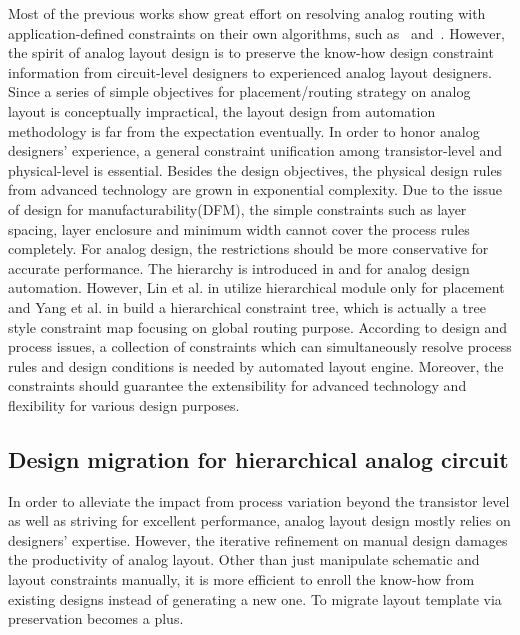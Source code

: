         Most of the previous works show great effort on resolving analog routing with application-defined constraints on their own algorithms, such as~\cite{anrmfca-CICC1990,sensitAR-iccad90} and~\cite{arearouting-tcad1993}. However, the spirit of analog layout design is to preserve the know-how design constraint information from circuit-level designers to experienced analog layout designers. Since a series of simple objectives for placement/routing strategy on analog layout is conceptually impractical, the layout design from automation methodology is far from the expectation eventually. In order to honor analog designers' experience, a general constraint unification among transistor-level and physical-level is essential. Besides the design objectives, the physical design rules from advanced technology are grown in exponential complexity. Due to the issue of design for manufacturability(DFM), the simple constraints such as layer spacing, layer enclosure and minimum width cannot cover the process rules completely. For analog design, the restrictions should be more conservative for accurate performance. The hierarchy is introduced in \cite{phLin-dac2008} and \cite{ymYang-isqed2010} for analog design automation. However, Lin et al. in \cite{phLin-dac2008} utilize hierarchical module only for placement and Yang et al. in \cite{ymYang-isqed2010} build a hierarchical constraint tree, which is actually a tree style constraint map focusing on global routing purpose. According to design and process issues, a collection of constraints which can simultaneously resolve process rules and design conditions is needed by automated layout engine. Moreover, the constraints should guarantee the extensibility for advanced technology and flexibility for various design purposes.   

    \subsection{Design migration for hierarchical analog circuit}\label{subsec:DMOverview}
      
      In order to alleviate the impact from process variation beyond the transistor level as well as striving for excellent performance, analog layout design mostly relies on designers' expertise. However, the iterative refinement on manual design damages the productivity of analog layout. Other than just manipulate schematic and layout constraints manually, it is more efficient to enroll the know-how from existing designs instead of generating a new one. To migrate layout template via preservation becomes a plus.

